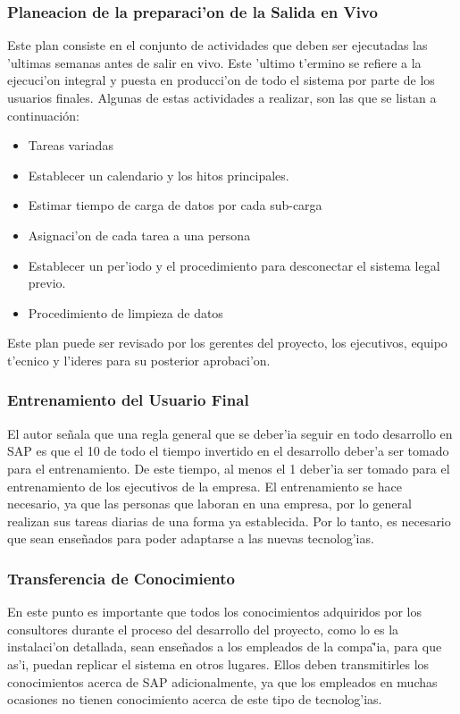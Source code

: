 \subsubsection{Planeacion de la preparaci'on de la Salida en Vivo}
Este plan consiste en el conjunto de actividades que deben ser ejecutadas las 'ultimas semanas antes de salir en vivo. Este 'ultimo t'ermino se refiere a la ejecuci'on integral y puesta en producci'on de todo el sistema por parte de los usuarios finales. 
	Algunas de estas actividades a realizar, son las que se listan a continuación:
\begin{itemize}
\item Tareas variadas
\item Establecer un calendario y los hitos principales.
\item Estimar tiempo de carga de datos por cada sub-carga
\item Asignaci'on de cada tarea a una persona
\item Establecer un per'iodo y el procedimiento para desconectar el sistema legal previo.
\item Procedimiento de limpieza de datos
\end{itemize}
	Este plan puede ser revisado por los gerentes del proyecto, los ejecutivos, equipo t'ecnico y l'ideres para su posterior aprobaci'on. 
	
\subsubsection{Entrenamiento del Usuario Final}
	El autor se\~nala que una regla general que se deber'ia seguir en todo desarrollo en SAP es que el 10 de todo el tiempo invertido en el desarrollo deber'a ser tomado para el entrenamiento. De este tiempo, al menos el 1 deber'ia ser tomado para el entrenamiento de los ejecutivos de la empresa. 
	El entrenamiento se hace necesario, ya que las personas que laboran en una empresa, por lo general realizan sus tareas diarias de una forma ya establecida. Por lo tanto, es necesario que sean ense\~nados para poder adaptarse a las nuevas tecnolog'ias. 
	
\subsubsection{Transferencia de Conocimiento}
	En este punto es importante que todos los conocimientos adquiridos por los consultores durante el proceso del desarrollo del proyecto, como lo es la instalaci'on detallada, sean ense\~nados a los empleados de la compa\~'ia, para que as'i, puedan replicar el sistema en otros lugares. Ellos deben transmitirles los conocimientos acerca de SAP adicionalmente, ya que los empleados en muchas ocasiones no tienen conocimiento acerca de este tipo de tecnolog'ias. 
	
